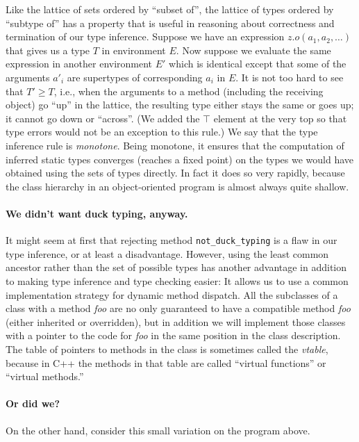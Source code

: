 \documentclass[11pt]{article}
\begin{document}
Like the lattice of sets ordered by ``subset of'', the lattice of
types ordered by ``subtype of'' has a property that is useful in
reasoning about correctness and termination of our type
inference.   Suppose we have an expression \( z.o(a_1, a_2, \ldots )\)
that gives us a type $T$ in environment $E$.  Now suppose we evaluate
the same expression in another environment $E'$ which is identical
except that some of the arguments $a'_i$ are supertypes of
corresponding $a_i$ in $E$.  It is not too hard to see that $T' \ge
T$, i.e., when the arguments to a method (including the receiving
object) go ``up'' in the lattice, the resulting type either stays the
same or goes up;  it cannot go down or ``across''.   (We added the
$\top$ element at the very top so that type errors would not be an
exception to this rule.)   
 We say that the
type inference rule is \emph{monotone}.   Being monotone, it ensures
that the computation of inferred static types converges (reaches a
fixed point) on the types we would have obtained using the sets of
types directly.  In fact it does so very rapidly, because the class
hierarchy in an object-oriented program is almost always quite
shallow.

\paragraph{We didn't want duck typing, anyway.}
It might seem at first that rejecting method \verb|not_duck_typing| is
a flaw in our type inference, or at least a disadvantage.  However,
using the least common ancestor rather than the set of possible types
has another advantage in addition to making type inference and type
checking easier:  It allows us to use a common implementation strategy
for dynamic method dispatch.  All the subclasses of a class with a
method \emph{foo} are no only guaranteed to have a compatible method
\emph{foo}  (either inherited or overridden), but in addition we will
implement those classes with a pointer to the code for \emph{foo} in
the same position in the class description.  The table of pointers to
methods in the class is sometimes called the \emph{vtable}, because in
C++ the methods in that table are called ``virtual functions'' or
``virtual methods.''  

\paragraph{Or did we?}  On the other hand, consider this small variation on
the program above. 
\end{document}
